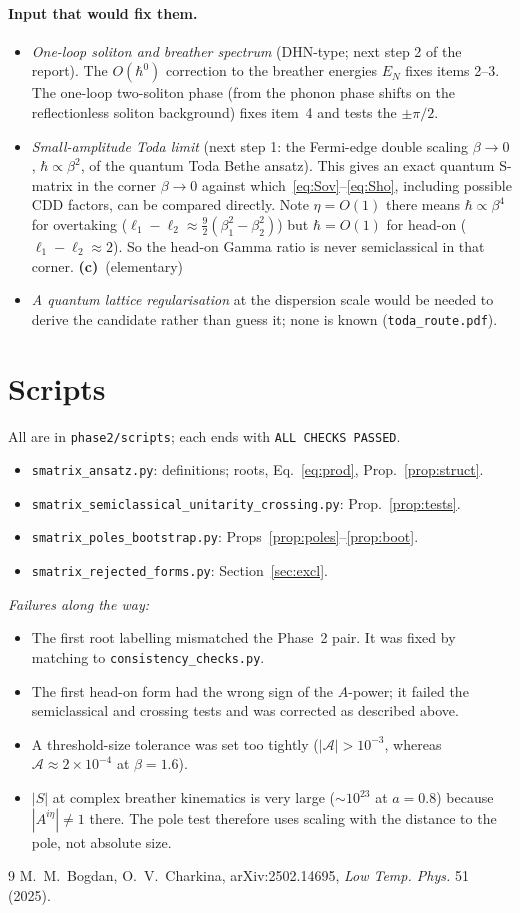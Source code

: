 \documentclass[11pt,a4paper]{article}
\newcommand{\Lc}{\textsf{\textbf{(c)}}}
\theoremstyle{remark}\newtheorem{remark}[proposition]{Remark}
\newcommand{\cA}{\mathcal A}
\begin{document}
\paragraph{Input that would fix them.}
\begin{itemize}
\item \emph{One-loop soliton and breather spectrum} (DHN-type; next step 2 of the report). The $O(\hbar^0)$ correction to the breather energies $E_N$ fixes items 2--3. The one-loop two-soliton phase (from the phonon phase shifts on the reflectionless soliton background) fixes item~4 and tests the $\pm\pi/2$.
\item \emph{Small-amplitude Toda limit} (next step 1: the Fermi-edge double scaling $\beta\to0$, $\hbar\propto\beta^2$, of the quantum Toda Bethe ansatz). This gives an exact quantum S-matrix in the corner $\beta\to0$ against which~\eqref{eq:Sov}--\eqref{eq:Sho}, including possible CDD factors, can be compared directly. Note $\eta=O(1)$ there means $\hbar\propto\beta^4$ for overtaking ($\ell_1-\ell_2\approx\tfrac92(\beta_1^2-\beta_2^2)$) but $\hbar=O(1)$ for head-on ($\ell_1-\ell_2\approx2$). So the head-on Gamma ratio is never semiclassical in that corner. \Lc\ (elementary)
\item \emph{A quantum lattice regularisation} at the dispersion scale would be needed to derive the candidate rather than guess it; none is known (\texttt{toda\_route.pdf}).
\end{itemize}

\appendix\section{Scripts}
All are in \texttt{phase2/scripts}; each ends with \texttt{ALL CHECKS PASSED}.
\begin{itemize}
\item \texttt{smatrix\_ansatz.py}: definitions; roots, Eq.~\eqref{eq:prod}, Prop.~\ref{prop:struct}.
\item \texttt{smatrix\_semiclassical\_unitarity\_crossing.py}: Prop.~\ref{prop:tests}.
\item \texttt{smatrix\_poles\_bootstrap.py}: Props~\ref{prop:poles}--\ref{prop:boot}.
\item \texttt{smatrix\_rejected\_forms.py}: Section~\ref{sec:excl}.
\end{itemize}
\emph{Failures along the way:}
\begin{itemize}
\item The first root labelling mismatched the Phase~2 pair. It was fixed by matching to \texttt{consistency\_checks.py}.
\item The first head-on form had the wrong sign of the $A$-power; it failed the semiclassical and crossing tests and was corrected as described above.
\item A threshold-size tolerance was set too tightly ($|\cA|>10^{-3}$, whereas $\cA\approx2\times10^{-4}$ at $\beta=1.6$).
\item $|S|$ at complex breather kinematics is very large ($\sim10^{23}$ at $a=0.8$) because $|A^{i\eta}|\neq1$ there. The pole test therefore uses scaling with the distance to the pole, not absolute size.
\end{itemize}

\begin{thebibliography}{9}\small
{} M.~M.~Bogdan, O.~V.~Charkina, arXiv:2502.14695, \emph{Low Temp. Phys.} 51 (2025).
\end{thebibliography}
\end{document}
